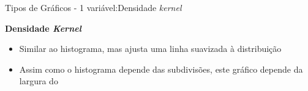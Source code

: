 \documentclass{beamer}\usepackage[]{graphicx}\usepackage[]{color}
\begin{document}
\begin{frame}{Tipos de Gráficos - 1 variável:Densidade \emph{kernel}}

\textbf{Densidade \emph{Kernel}}

\begin{itemize}
  \item Similar ao histograma, mas ajusta uma linha suavizada à distribuição \pause
  \vfill
  \item  Assim como o histograma depende das subdivisões, este gráfico depende da largura do  \pause
\end{itemize}


\end{frame} 
\end{document}
